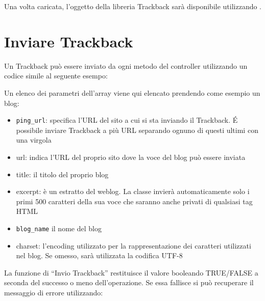 Una volta caricata, l'oggetto della libreria Trackback sarà disponibile utilizzando .

\section*{Inviare Trackback}

Un Trackback può essere inviato da ogni metodo del controller utilizzando un codice simile al seguente esempo:


Un elenco dei parametri dell'array viene qui elencato prendendo come esempio un blog:

\begin{itemize}
\item \verb|ping_url|: specifica l'URL del sito a cui si sta inviando il Trackback. \'E possibile inviare Trackback a più URL separando ognuno di questi ultimi con una virgola
\item url: indica l'URL del proprio sito dove la voce del blog può essere inviata
\item title: il titolo del proprio blog
\item excerpt: è un estratto del weblog. La classe invierà automaticamente solo i primi 500 caratteri della sua voce che saranno anche privati di qualsiasi tag HTML
\item \verb|blog_name| il nome del blog
\item charset: l'encoding utilizzato per la rappresentazione dei caratteri utilizzati nel blog. Se omesso, sarà utilizzata la codifica UTF-8
\end{itemize}

La funzione di ``Invio Trackback'' restituisce il valore booleando TRUE/FALSE a seconda del successo o meno dell'operazione. Se essa fallisce si può recuperare il messaggio di errore utilizzando:

